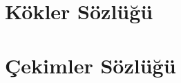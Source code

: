 
\chapter{Kökler Sözlüğü}
\noindent
\setlength{\parindent}{0pt}


\newpage






\chapter{Çekimler Sözlüğü}
\newpage






